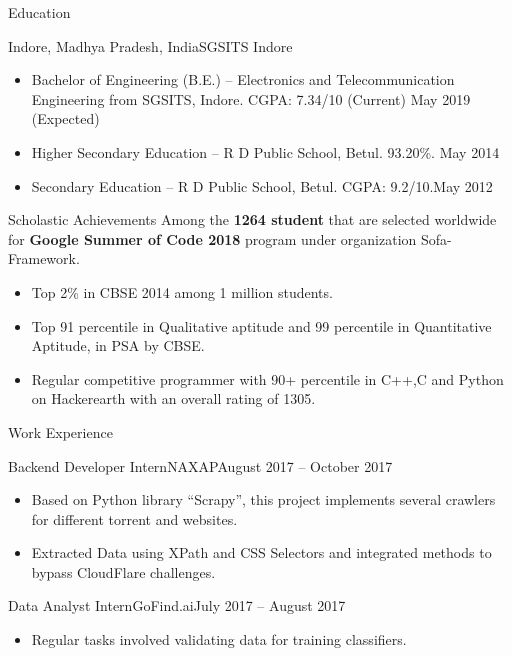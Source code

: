 \documentclass[]{mcdowellcv}
\begin{document}
	\makeheader

	\begin{cvsection}{Education}
		\begin{cvsubsection}{Indore, Madhya Pradesh, India}{SGSITS Indore}{}
			\begin{itemize}
				\item Bachelor of Engineering (B.E.) -- Electronics and Telecommunication Engineering from SGSITS, Indore.     CGPA: 7.34/10 (Current) \hfill May 2019 (Expected)
				\item Higher Secondary Education -- R D Public School, Betul. 93.20\%. \hfill May 2014
				\item Secondary Education -- R D Public School, Betul. CGPA: 9.2/10.\hfill May 2012
			\end{itemize}
		\end{cvsubsection}
	\end{cvsection}

	\begin{cvsection}{Scholastic Achievements}{}{}
	Among the \textbf{1264 student} that are selected worldwide for \textbf{Google Summer of Code 2018} program under organization Sofa-Framework.
			\begin{itemize}
				\item Top 2\% in CBSE 2014 among 1 million students.
				\item Top 91 percentile in Qualitative aptitude and 99 percentile in Quantitative Aptitude, in PSA by CBSE.
                \item Regular competitive programmer with 90+ percentile in C++,C and Python on Hackerearth with an overall rating of 1305.
			\end{itemize}
		
	\end{cvsection}
	\begin{cvsection}{Work Experience}
		\begin{cvsubsection}{Backend Developer Intern}{NAXAP}{August 2017 -- October 2017}
			\begin{itemize}
				\item Based on Python library “Scrapy”, this project implements several crawlers for different torrent and websites.
	   			\item Extracted Data using XPath and CSS Selectors and integrated methods to bypass CloudFlare challenges.
	   			\end{itemize}
		\end{cvsubsection}
		
		\begin{cvsubsection}{Data Analyst Intern}{GoFind.ai}{July 2017 -- August 2017}
			\begin{itemize}
				\item Regular tasks involved validating data for training classifiers.
				\end{itemize}
		\end{cvsubsection}
	\end{cvsection}
	
\end{document}
